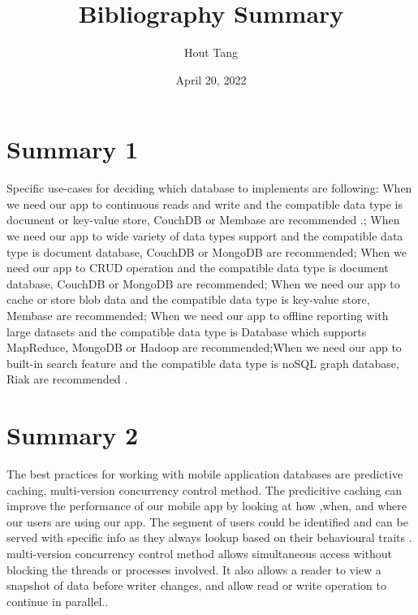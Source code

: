 \documentclass{article}
\title{Bibliography Summary}
\author{Hout Tang}
\date{April 20, 2022}
\begin{document}
\maketitle

\section*{Summary 1}

Specific use-cases for deciding which database to implements are following: When we need our app to continuous reads and write and the compatible data type is document or key-value store, CouchDB or Membase are recommended \cite{JSArticle}.; When we need our app to wide variety of data types support and the compatible data type is document database, CouchDB or MongoDB  are recommended; When we need our app to CRUD operation and the compatible data type is document database, CouchDB or MongoDB are recommended; When we need our app to cache or store blob data and the compatible data type is key-value store, Membase are recommended; When we need our app to offline reporting with large datasets and the compatible data type is Database which supports MapReduce, MongoDB or Hadoop are recommended;When we need our app to built-in search feature and the compatible data type is noSQL graph database, Riak are recommended \cite{JSArticle}.

 

\medskip

\section*{Summary 2}

The best practices for working with mobile application databases are predictive caching, multi-version concurrency control method. The predicitive caching can improve the performance of our mobile app by looking at how ,when, and where our users are using our app. The segment of users could be identified and can be served with specific info as they always lookup based on their behavioural traits \cite{JSArticle}. multi-version concurrency control method allows simultaneous access without blocking the threads or processes involved. It also allows a reader to view a snapshot of data before writer changes, and allow read or write operation to continue in parallel.\cite{VTArticle}.
 
\printbibliography
\end{document}
